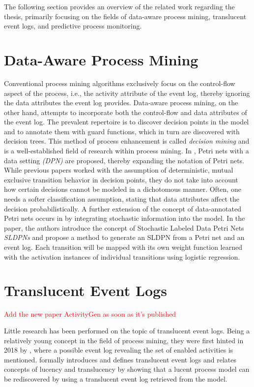 The following section provides an overview of the related work regarding the thesis, primarily focusing on the fields of data-aware process mining, translucent event logs, and predictive process monitoring.

\section{Data-Aware Process Mining}

Conventional process mining algorithms exclusively focus on the control-flow aspect of the process, i.e., the activity attribute of the event log, thereby ignoring the data attributes the event log provides. Data-aware process mining, on the other hand, attempts to incorporate both the control-flow and data attributes of the event log. The prevalent repertoire is to discover decision points in the model and to annotate them with guard functions, which in turn are discovered with decision trees. This method of process enhancement is called \emph{decision mining} \cite{decision-mining-in-prom,decision-mining-in-business-processes,data-aware-process-mining} and is a well-established field of research within process mining. In \cite{data-aware-process-mining}, Petri nets with a data setting \emph{(DPN)} are proposed, thereby expanding the notation of Petri nets. While previous papers worked with the assumption of deterministic, mutual exclusive transition behavior in decision points, they do not take into account how certain decisions cannot be modeled in a dichotomous manner. Often, one needs a softer classification assumption, stating that data attributes affect the decision probabilistically. A further extension of the concept of data-annotated Petri nets occurs in \cite{sldpn} by integrating stochastic information into the model. In the paper, the authors introduce the concept of Stochastic Labeled Data Petri Nets \emph{SLDPNs} and propose a method to generate an SLDPN from a Petri net and an event log. Each transition will be mapped with its own weight function learned with the activation instances of individual transitions using logistic regression.

\section{Translucent Event Logs}

\textcolor{red}{Add the new paper ActivityGen as soon as it's published}

Little research has been performed on the topic of translucent event logs. Being a relatively young concept in the field of process mining, they were first hinted in 2018 by \cite{lucency-first-paper}, where a possible event log revealing the set of enabled activities is mentioned. \cite{Translucent-event-logs-first-paper} formally introduces and defines translucent event logs and relates concepts of lucency and translucency by showing that a lucent process model can be rediscovered by using a translucent event log retrieved from the model.

